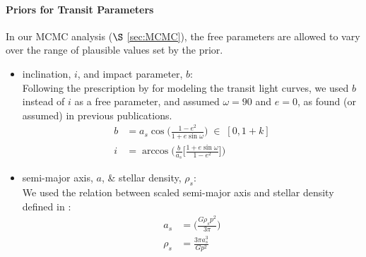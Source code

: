 \paragraph{Priors for Transit Parameters}
In our MCMC analysis ($\S$ \ref{sec:MCMC}), the free parameters are allowed to vary over the range of plausible values set by the prior. 

\begin{itemize} %
\item inclination, $i$, and impact parameter, $b$:\\
Following the prescription by \cite{Parviainen2017} for modeling the transit light curves, we used $b$ instead of $i$ as a free parameter, and assumed $\omega=90$ and $e=0$, as found (or assumed) in previous publications. 
\begin{align}
b &= a_s\cos\Big(\frac{1-e^2}{1+e\sin\omega} \Big) \; \in \; [0,1+k] \\ 
i  &= \arccos\Big( \frac{b}{a_s} \Big[ \frac{1+e\sin \omega}{1-e^2} \Big ] \Big)
\end{align}

\item semi-major axis, $a$, \& stellar density, $\rho_s$:\\
We used the relation between scaled semi-major axis and stellar density defined in \cite{SeagerMallen-Ornelas2003}:
\begin{align}
a_s &= \Big( \frac{G\rho_sp^2}{3\pi}\Big)\\
\rho_s &= \frac{3\pi a^3_s}{Gp^2}  \label{eq:rho_star}
\end{align}


\end{itemize}
